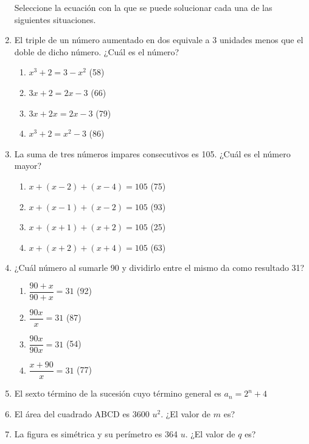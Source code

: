 \documentclass[letterpaper,11pt,twoside]{article}
\begin{document}
\begin{multicols}{2}
\begin{enumerate}
Seleccione la ecuación con la que se puede solucionar cada una de las siguientes situaciones.
\item El triple de un número aumentado en dos equivale a 3 unidades menos que el doble de dicho número. ¿Cuál es el número?
\begin{enumerate}
\item $x^{3}+2=3-x^{2}$ (58)
\item $3x+2=2x-3$ (66)
\item $3x+2x=2x-3$ (79)
\item $x^{3}+2=x^{2}-3$ (86)
\end{enumerate}
\item La suma de tres números impares consecutivos es 105. ¿Cuál es el número mayor?
\begin{enumerate}
\item $x+(x-2)+(x-4)=105$ (75)
\item $x+(x-1)+(x-2)=105$ (93)
\item $x+(x+1)+(x+2)=105$ (25)
\item $x+(x+2)+(x+4)=105$ (63)
\end{enumerate}
\item ¿Cuál número al sumarle 90 y dividirlo entre el mismo da como resultado 31?
\begin{enumerate}
\item $\dfrac{90+x}{90+x}=31$ (92)
\item $\dfrac{90x}{x}=31$ (87)
\item $\dfrac{90x}{90x}=31$ (54)
\item $\dfrac{x+90}{x}=31$ (77)
\end{enumerate}
\item El sexto término de la sucesión cuyo término general es $a_{n}=2^{n}+4$
\item El área del cuadrado ABCD es 3600 $u^{2}$. ¿El valor de $m$ es?
\begin{center}
\end{center}
\item La figura es simétrica y su perímetro es 364 $u$. ¿El valor de $q$ es?
\begin{center}

\end{center}
\end{enumerate}
\end{multicols}
\end{document}
